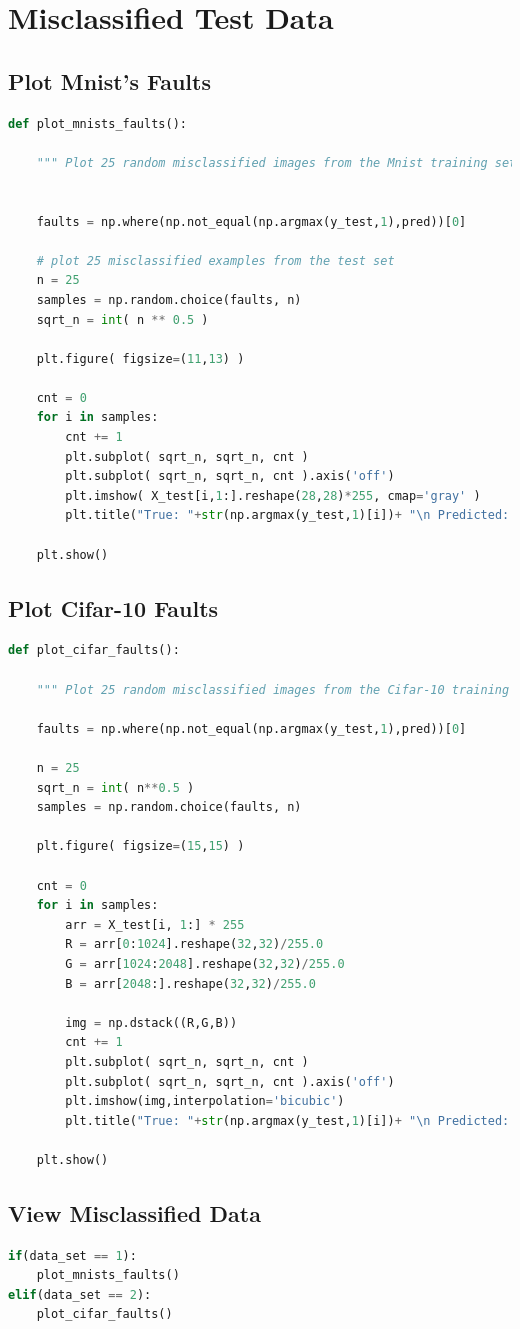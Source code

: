 \documentclass[11pt]{article}
\begin{document}
\hfill
\newline

\section{Misclassified Test Data}

\subsection{Plot Mnist's Faults}
\begin{lstlisting}[language = Python]
def plot_mnists_faults():
    
    """ Plot 25 random misclassified images from the Mnist training set. """  

    
    faults = np.where(np.not_equal(np.argmax(y_test,1),pred))[0]

    # plot 25 misclassified examples from the test set
    n = 25
    samples = np.random.choice(faults, n)
    sqrt_n = int( n ** 0.5 )

    plt.figure( figsize=(11,13) )

    cnt = 0
    for i in samples:
        cnt += 1
        plt.subplot( sqrt_n, sqrt_n, cnt )
        plt.subplot( sqrt_n, sqrt_n, cnt ).axis('off')
        plt.imshow( X_test[i,1:].reshape(28,28)*255, cmap='gray' )
        plt.title("True: "+str(np.argmax(y_test,1)[i])+ "\n Predicted: "+ str(pred[i]))

    plt.show()
\end{lstlisting}
\newpage

\subsection{Plot Cifar-10 Faults}
\begin{lstlisting}[language = Python]
def plot_cifar_faults():
    
    """ Plot 25 random misclassified images from the Cifar-10 training set. """  
    
    faults = np.where(np.not_equal(np.argmax(y_test,1),pred))[0]

    n = 25
    sqrt_n = int( n**0.5 )
    samples = np.random.choice(faults, n)

    plt.figure( figsize=(15,15) )

    cnt = 0
    for i in samples:
        arr = X_test[i, 1:] * 255
        R = arr[0:1024].reshape(32,32)/255.0
        G = arr[1024:2048].reshape(32,32)/255.0
        B = arr[2048:].reshape(32,32)/255.0

        img = np.dstack((R,G,B))
        cnt += 1
        plt.subplot( sqrt_n, sqrt_n, cnt )
        plt.subplot( sqrt_n, sqrt_n, cnt ).axis('off')
        plt.imshow(img,interpolation='bicubic')
        plt.title("True: "+str(np.argmax(y_test,1)[i])+ "\n Predicted: "+ str(pred[i]))

    plt.show()
\end{lstlisting}
\hfill
\hfill
\subsection{View Misclassified Data}

\begin{lstlisting}[language = Python]
if(data_set == 1):
    plot_mnists_faults()
elif(data_set == 2):
    plot_cifar_faults()
\end{lstlisting}

\nocite{*}
 
\underline{}

\end{document}
